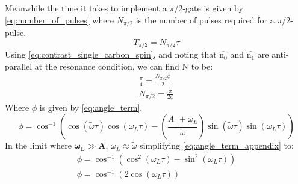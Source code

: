 Meanwhile the time it takes to implement a $\pi/2$-gate is given by \cref{eq:number_of_pulses} where $N_{\pi/2} $ is the number of pulses required for a $\pi/2$-pulse.
\begin{equation}
    T_{\pi/2}= N_{\pi/2} \tau
    \label{eq:number_of_pulses}
\end{equation}
Using \cref{eq:contrast_single_carbon_spin}, and noting that $\hat{\mathrm{n_0}}$ and $\hat{\mathrm{n_1}}$ are anti-parallel at the resonance condition, we can find N to be:
\begin{eqnarray}
    \frac{\pi}{4} = \frac{N_{\pi/2} \phi}{2}\\
    N_{\pi/2}=\frac{\pi}{2\phi}
\end{eqnarray}
Where $\phi$ is given by \cref{eq:angle_term}.
\begin{equation}
    \phi =  \cos^{-1}\left(\cos(\tilde{\omega} \tau) \cos(\omega_L \tau)-\left(\frac{ A_ \parallel + \omega_L }{ \tilde{ \omega}}\right) \sin(\tilde{\omega} \tau)\sin(\omega_L \tau)\right)
    \label{eq:angle_term_appendix}
\end{equation}
In the limit where $\bm{\omega_L} \gg \bm{A}$, $\omega_L \approx \tilde{\omega}$ simplifying \cref{eq:angle_term_appendix} to:
\begin{eqnarray}
    \phi = \cos^{-1} \left(\cos^2(\omega_L \tau) -  \sin^2(\omega_L \tau) \right)\\
    \phi = \cos^{-1} \left(2 \cos(\omega_L \tau)\right)
\end{eqnarray}
